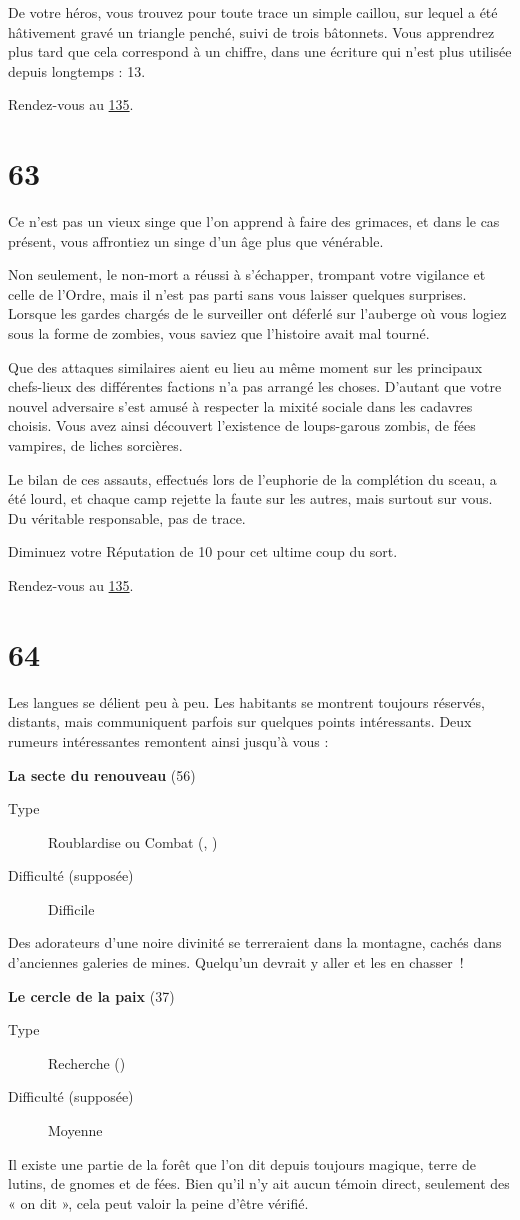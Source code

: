 \documentclass{report}
\newcommand{\gsection}[1]{
    \section{#1}
    \label{section-#1}
}
\newcommand{\glink}[1]{\hyperref[section-#1]{#1}}
\newcommand{\quest}[5]{
    \begin{mdframed}[innertopmargin=0.5cm,innerbottommargin=0.5cm,leftmargin=0.5cm,rightmargin=0.5cm]
        \begin{center}
            \textbf{#1} (#2)
        \end{center}
        \begin{description}
            \item[Type] #3
            \item[Difficulté (supposée)] #4
        \end{description}
        #5
    \end{mdframed}
}
\begin{document}
De votre héros, vous trouvez pour toute trace un simple caillou, sur lequel a été hâtivement gravé un triangle penché, suivi de trois bâtonnets. Vous apprendrez plus tard que cela correspond à un chiffre, dans une écriture qui n'est plus utilisée depuis longtemps : 13.

Rendez-vous au \glink{135}.

\gsection{63}

Ce n'est pas un vieux singe que l'on apprend à faire des grimaces, et dans le cas présent, vous affrontiez un singe d'un âge plus que vénérable.

Non seulement, le non-mort a réussi à s'échapper, trompant votre vigilance et celle de l'Ordre, mais il n'est pas parti sans vous laisser quelques surprises. Lorsque les gardes chargés de le surveiller ont déferlé sur l'auberge où vous logiez sous la forme de zombies, vous saviez que l'histoire avait mal tourné.

Que des attaques similaires aient eu lieu au même moment sur les principaux chefs-lieux des différentes factions n'a pas arrangé les choses. D'autant que votre nouvel adversaire s'est amusé à respecter la mixité sociale dans les cadavres choisis. Vous avez ainsi découvert l'existence de loups-garous zombis, de fées vampires, de liches sorcières.

Le bilan de ces assauts, effectués lors de l'euphorie de la complétion du sceau, a été lourd, et chaque camp rejette la faute sur les autres, mais surtout sur vous. Du véritable responsable, pas de trace.

Diminuez votre Réputation de 10 pour cet ultime coup du sort.

Rendez-vous au \glink{135}.

\gsection{64}

Les langues se délient peu à peu. Les habitants se montrent toujours réservés, distants, mais communiquent parfois sur quelques points intéressants. Deux rumeurs intéressantes remontent ainsi jusqu'à vous :

\quest{La secte du renouveau}{56}{Roublardise ou Combat (\ankh, \cross)}{Difficile}{
Des adorateurs d'une noire divinité se terreraient dans la montagne, cachés dans d'anciennes galeries de mines. Quelqu'un devrait y aller et les en chasser !
}

\quest{Le cercle de la paix}{37}{Recherche (\caduceus)}{Moyenne}{
Il existe une partie de la forêt que l'on dit depuis toujours magique, terre de lutins, de gnomes et de fées. Bien qu'il n'y ait aucun témoin direct, seulement des « on dit », cela peut valoir la peine d'être vérifié.
}
\end{document}
